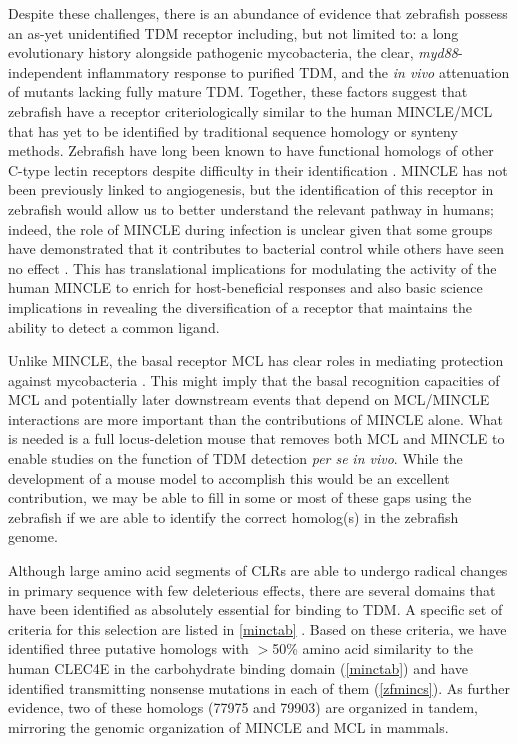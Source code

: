 Despite these challenges, there is an abundance of evidence that zebrafish possess an as\hyp{}yet unidentified TDM receptor including, but not limited to: a long evolutionary history alongside pathogenic mycobacteria, the clear, \textit{myd88}\hyp{}independent inflammatory response to purified TDM, and the \textit{in vivo} attenuation of mutants lacking fully mature TDM. Together, these factors suggest that zebrafish have a receptor criteriologically similar to the human MINCLE/MCL that has yet to be identified by traditional sequence homology or synteny methods. Zebrafish have long been known to have functional homologs of other C\hyp{}type lectin receptors despite difficulty in their identification \citep{Petit2019, Panagos2006, Yoder2004}. MINCLE has not been previously linked to angiogenesis, but the identification of this receptor in zebrafish would allow us to better understand the relevant pathway in humans; indeed, the role of MINCLE during infection is unclear given that some groups have demonstrated that it contributes to bacterial control \citep{Behler2012, Behler2015, Lee2012} while others have seen no effect \citep{Heitmann2013}. This has translational implications for modulating the activity of the human MINCLE to enrich for host\hyp{}beneficial responses and also basic science implications in revealing the diversification of a receptor that maintains the ability to detect a common ligand. 

Unlike MINCLE, the basal receptor MCL has clear roles in mediating protection against mycobacteria \citep{Wilson2015}. This might imply that the basal recognition capacities of MCL and potentially later downstream events that depend on MCL/MINCLE interactions are more important than the contributions of MINCLE alone. What is needed is a full locus\hyp{}deletion mouse that removes both MCL and MINCLE to enable studies on the function of TDM detection \textit{per se} \textit{in vivo}. While the development of a mouse model to accomplish this would be an excellent contribution, we may be able to fill in some or most of these gaps using the zebrafish if we are able to identify the correct homolog(s) in the zebrafish genome.

Although large amino acid segments of CLRs are able to undergo radical changes in primary sequence with few deleterious effects, there are several domains that have been identified as absolutely essential for binding to TDM. A specific set of criteria for this selection are listed in \autoref{minctab} \citep{Alenton2017, Feinberg2016, Feinberg2013, Bird2018, Furukawa2013, Zelensky2005}. Based on these criteria, we have identified three putative homologs with $>$50\% amino acid similarity to the human CLEC4E in the carbohydrate binding domain (\autoref{minctab}) and have identified transmitting nonsense mutations in each of them (\autoref{zfmincs}). As further evidence, two of these homologs (77975 and 79903) are organized in tandem, mirroring the genomic organization of MINCLE and MCL in mammals. 

